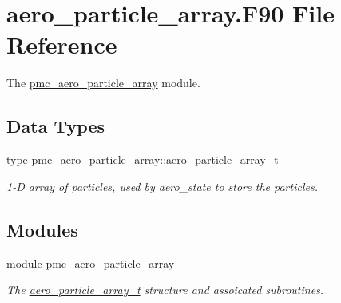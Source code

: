 \hypertarget{aero__particle__array_8_f90}{}\section{aero\+\_\+particle\+\_\+array.\+F90 File Reference}
\label{aero__particle__array_8_f90}


The \mbox{\hyperlink{namespacepmc__aero__particle__array}{pmc\+\_\+aero\+\_\+particle\+\_\+array}} module.  


\subsection*{Data Types}
\begin{DoxyCompactItemize}
\item 
type \mbox{\hyperlink{structpmc__aero__particle__array_1_1aero__particle__array__t}{pmc\+\_\+aero\+\_\+particle\+\_\+array\+::aero\+\_\+particle\+\_\+array\+\_\+t}}
\begin{DoxyCompactList}\small\item\em 1-\/D array of particles, used by aero\+\_\+state to store the particles. \end{DoxyCompactList}\end{DoxyCompactItemize}
\subsection*{Modules}
\begin{DoxyCompactItemize}
\item 
module \mbox{\hyperlink{namespacepmc__aero__particle__array}{pmc\+\_\+aero\+\_\+particle\+\_\+array}}
\begin{DoxyCompactList}\small\item\em The \mbox{\hyperlink{structpmc__aero__particle__array_1_1aero__particle__array__t}{aero\+\_\+particle\+\_\+array\+\_\+t}} structure and assoicated subroutines. \end{DoxyCompactList}\end{DoxyCompactItemize}
